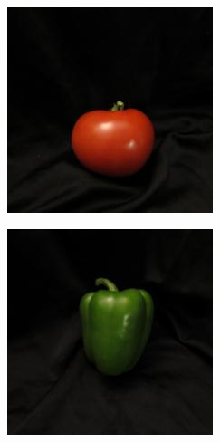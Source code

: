 \documentclass{article} %
\begin{document}
\begin{figure}[h]
\begin{subfigure}{.123\textwidth}
\end{subfigure}\,
  \begin{subfigure}{.123\textwidth}
  \centering
\includegraphics[width=\textwidth]{3_1.jpg}
\end{subfigure}%
 \begin{subfigure}{.123\textwidth}
  \centering
\includegraphics[width=\textwidth]{3_5.jpg}

\end{subfigure}
\end{figure}
\end{document}
